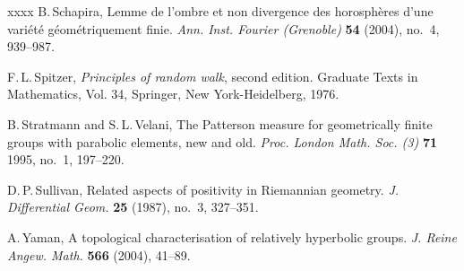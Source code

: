 \documentclass[12pt,a4paper]{amsart}
\numberwithin{equation}{section}
\theoremstyle{definition}
\begin{document}
\begin{thebibliography}{xxxx}
B.\,Schapira,
Lemme de l'ombre et non divergence des horosph\`eres d'une vari\'{e}t\'{e} g\'{e}om\'{e}triquement finie.
\emph{Ann. Inst. Fourier (Grenoble)} {\bf 54} (2004), no.~4, 939--987.

F.\,L.\,Spitzer,
\emph{Principles of random walk}, second edition.
Graduate Texts in Mathematics, Vol. 34, Springer, New York-Heidelberg, 1976.

B.\,Stratmann and S.\,L.\,Velani,
The Patterson measure for geometrically finite groups with parabolic elements, new and old.
\emph{Proc. London Math. Soc. (3)} {\bf 71} 1995, no.~1, 197--220.

D.\,P.\,Sullivan,
Related aspects of positivity in {R}iemannian geometry.
\emph{J. Differential Geom.} {\bf 25} (1987), no.~3, 327--351.

A.\,Yaman, 
A topological characterisation of relatively hyperbolic groups.
\emph{J. Reine Angew. Math.} {\bf 566} (2004), 41–89.

\end{thebibliography}

\end{document}
